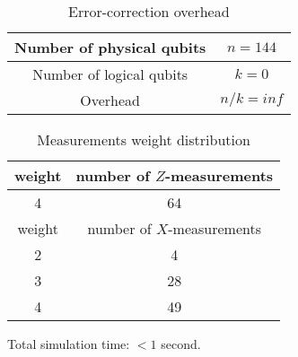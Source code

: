 \documentclass[12pt]{article}
\begin{document}
\newpage
\begin{table}[h]
\centering
\begin{tabular}{c c}
\hline
Number of physical qubits & $n = 144$ \\
\hline
Number of logical qubits & $k = 0$\\
\hline
Overhead & $n/k = inf$\\
\hline
\end{tabular}
\caption{Error-correction overhead}
\end{table}
\vspace{.3cm}


\begin{table}[h]
\centering
\begin{tabular}{c c}
\hline
weight & number of $Z$-measurements\\
\hline
4 & 64\\
\hline
\hline
weight & number of $X$-measurements\\
\hline
2 & 4\\
3 & 28\\
4 & 49\\
\hline
\end{tabular}
\caption{Measurements weight distribution}
\end{table}
\vspace{.3cm}



\vspace{2cm}
Total simulation time: $< 1$ second.
\end{document}
